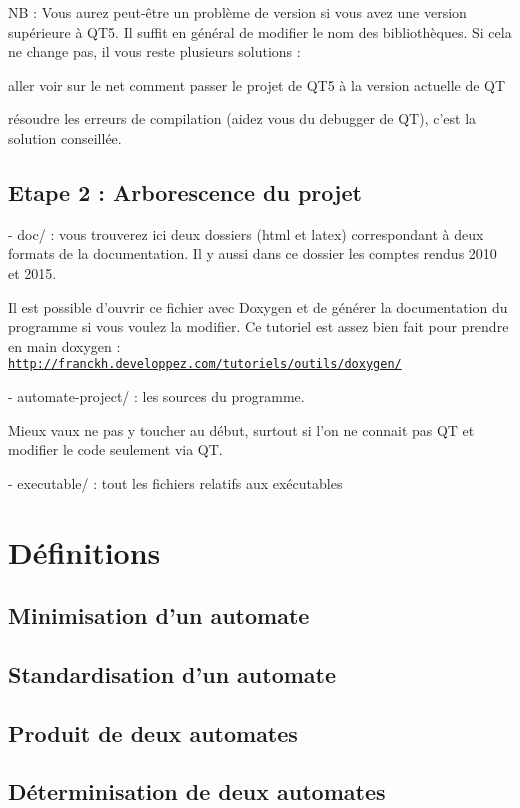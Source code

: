 N\-B \-: Vous aurez peut-\/être un problème de version si vous avez une version supérieure à Q\-T5. Il suffit en général de modifier le nom des bibliothèques. Si cela ne change pas, il vous reste plusieurs solutions \-:
\begin{DoxyItemize}
\item aller voir sur le net comment passer le projet de Q\-T5 à la version actuelle de Q\-T
\item résoudre les erreurs de compilation (aidez vous du debugger de Q\-T), c'est la solution conseillée.
\end{DoxyItemize}\hypertarget{index_etape2}{}\subsection{Etape 2 \-: Arborescence du projet}\label{index_etape2}
\begin{DoxyVerb}   - doc/ : vous trouverez ici deux dossiers (html et latex) correspondant à deux formats de la documentation. Il y aussi dans ce dossier les comptes rendus 2010 et 2015.
\end{DoxyVerb}
 Il est possible d'ouvrir ce fichier avec Doxygen et de générer la documentation du programme si vous voulez la modifier. Ce tutoriel est assez bien fait pour prendre en main doxygen \-: \href{http://franckh.developpez.com/tutoriels/outils/doxygen/}{\tt http\-://franckh.\-developpez.\-com/tutoriels/outils/doxygen/}

\begin{DoxyVerb}   - automate-project/ : les sources du programme.
\end{DoxyVerb}
 Mieux vaux ne pas y toucher au début, surtout si l'on ne connait pas Q\-T et modifier le code seulement via Q\-T. \begin{DoxyVerb}  - executable/ : tout les fichiers relatifs aux exécutables
\end{DoxyVerb}
\hypertarget{index_definitions}{}\section{Définitions}\label{index_definitions}
\hypertarget{index_minimisation}{}\subsection{Minimisation d'un automate}\label{index_minimisation}
\hypertarget{index_standardisation}{}\subsection{Standardisation d'un automate}\label{index_standardisation}
\hypertarget{index_produit}{}\subsection{Produit de deux automates}\label{index_produit}
\hypertarget{index_determinisation}{}\subsection{Déterminisation de deux automates}\label{index_determinisation}
